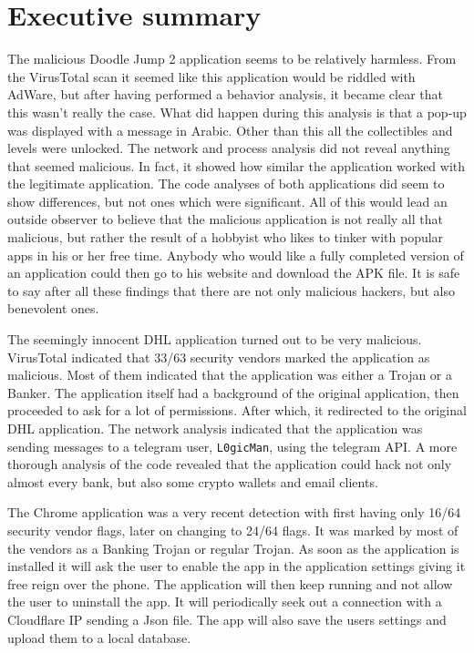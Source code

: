 \section*{Executive summary}

The malicious Doodle Jump 2 application seems to be relatively harmless.
From the VirusTotal scan it seemed like this application would be riddled with AdWare, but after having performed a behavior analysis, it became clear that this wasn’t really the case.
What did happen during this analysis is that a pop-up was displayed with a message in Arabic.
Other than this all the collectibles and levels were unlocked.
The network and process analysis did not reveal anything that seemed malicious.
In fact, it showed how similar the application worked with the legitimate application.
The code analyses of both applications did seem to show differences, but not ones which were significant.
All of this would lead an outside observer to believe that the malicious application is not really all that malicious, but rather the result of a hobbyist who likes to tinker with popular apps in his or her free time.
Anybody who would like a fully completed version of an application could then go to his website and download the APK file.
It is safe to say after all these findings that there are not only malicious hackers, but also benevolent ones.

The seemingly innocent DHL application turned out to be very malicious.
VirusTotal indicated that 33/63 security vendors marked the application as malicious.
Most of them indicated that the application was either a Trojan or a Banker.
The application itself had a background of the original application, then proceeded to ask for a lot of permissions.
After which, it redirected to the original DHL application.
The network analysis indicated that the application was sending messages to a telegram user, \texttt{L0gicMan}, using the telegram API.
A more thorough analysis of the code revealed that the application could hack not only almost every bank, but also some crypto wallets and email clients.

The Chrome application was a very recent detection with first having only 16/64 security vendor flags, later on changing to 24/64 flags. 
It was marked by most of the vendors as a Banking Trojan or regular Trojan. 
As soon as the application is installed it will ask the user to enable the app in the application settings giving it free reign over the phone. 
The application will then keep running and not allow the user to uninstall the app. 
It will periodically seek out a connection with a Cloudflare IP sending a Json file. 
The app will also save the users settings and upload them to a local database. 
